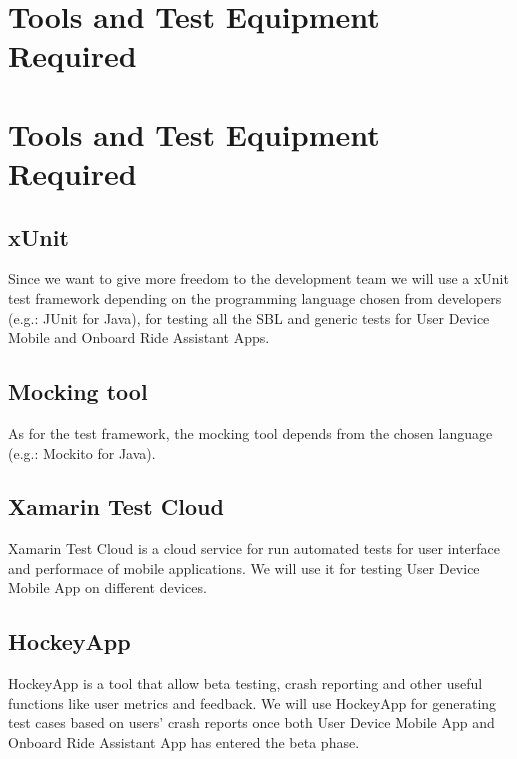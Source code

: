 \section{Tools and Test Equipment Required}
\section{Tools and Test Equipment Required}
\subsection{xUnit}
Since we want to give more freedom to the development team we will use a xUnit test framework depending on the programming language chosen from developers (e.g.:  JUnit for Java), for testing all the SBL and generic tests for User Device Mobile and Onboard Ride Assistant Apps.

\subsection{Mocking tool}
As for the test framework, the mocking tool depends from the chosen language (e.g.: Mockito for Java).

\subsection{Xamarin Test Cloud}
Xamarin Test Cloud is a cloud service for run automated tests for user interface and performace of mobile applications. We will use it for testing User Device Mobile App on different devices.

\subsection{HockeyApp}
HockeyApp is a tool that allow beta testing, crash reporting and other useful functions like user metrics and feedback. We will use HockeyApp for generating test cases based on users' crash reports once both User Device Mobile App and Onboard Ride Assistant App has entered the beta phase. 

